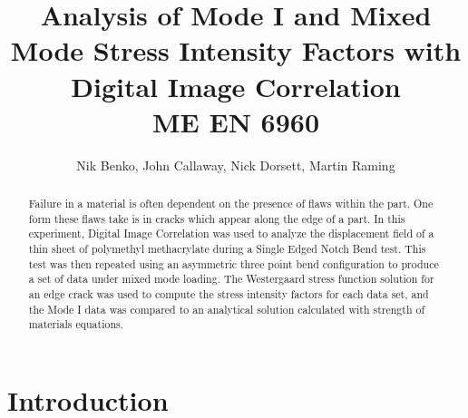 \documentclass[12pt]{article}
\begin{document}
\title{ Analysis of Mode I and Mixed Mode Stress Intensity Factors with Digital Image Correlation \\ \normalsize{ME EN 6960}}
\author{Nik Benko, John Callaway, Nick Dorsett, Martin Raming}
\maketitle


\begin{abstract} 
	Failure in a material is often dependent on the presence of flaws within the part. One form these flaws take is in cracks which appear along the edge of a part. In this experiment, Digital Image Correlation was used to analyze the displacement field of a thin sheet of polymethyl methacrylate during a Single Edged Notch Bend test. This test was then repeated using an asymmetric three point bend configuration to produce a set of data under mixed mode loading. The Westergaard stress function solution for an edge crack was used to compute the stress intensity factors for each data set, and the Mode I data was compared to an analytical solution calculated with strength of materials equations. 
\end{abstract}

\section{Introduction} %
\end{document}

